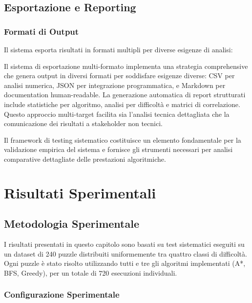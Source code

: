 \documentclass[12pt,a4paper]{report}
\theoremstyle{definition}
\begin{document}
\section{Esportazione e Reporting}

\subsection{Formati di Output}

Il sistema esporta risultati in formati multipli per diverse esigenze di analisi:

Il sistema di esportazione multi-formato implementa una strategia comprehensive che genera output in diversi formati per soddisfare esigenze diverse: CSV per analisi numerica, JSON per integrazione programmatica, e Markdown per documentation human-readable. La generazione automatica di report strutturati include statistiche per algoritmo, analisi per difficoltà e matrici di correlazione. Questo approccio multi-target facilita sia l'analisi tecnica dettagliata che la comunicazione dei risultati a stakeholder non tecnici.

Il framework di testing sistematico costituisce un elemento fondamentale per la validazione empirica del sistema e fornisce gli strumenti necessari per analisi comparative dettagliate delle prestazioni algoritmiche.

\chapter{Risultati Sperimentali}

\section{Metodologia Sperimentale}

I risultati presentati in questo capitolo sono basati su test sistematici eseguiti su un dataset di 240 puzzle distribuiti uniformemente tra quattro classi di difficoltà. Ogni puzzle è stato risolto utilizzando tutti e tre gli algoritmi implementati (A*, BFS, Greedy), per un totale di 720 esecuzioni individuali.

\subsection{Configurazione Sperimentale}
\end{document}
